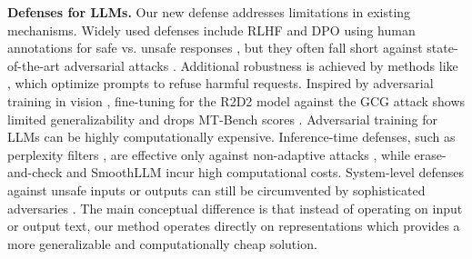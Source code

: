 \textbf{Defenses for LLMs.} \quad
Our new defense addresses limitations in existing mechanisms. Widely used defenses include RLHF \citep{christiano2017deep, ouyang2022training} and DPO \citep{rafailov2023direct} using human annotations for safe vs. unsafe responses \citep{touvron2023llama2}, but they often fall short against state-of-the-art adversarial attacks \citep{zou2023universal, andriushchenko2024jailbreaking}. Additional robustness is achieved by methods like \citet{zhou2024robust}, which optimize prompts to refuse harmful requests. Inspired by adversarial training in vision \citep{madry2017towards}, fine-tuning for the R2D2 model against the GCG attack \citep{mazeika2024harmbench} shows limited generalizability and drops MT-Bench scores \citep{zheng2023mtbench}. Adversarial training for LLMs can be highly computationally expensive. Inference-time defenses, such as perplexity filters \citep{alon2023detecting, jain2023baseline}, are effective only against non-adaptive attacks \citep{liu2023autodan}, while erase-and-check and SmoothLLM \citep{robey2023smoothllm} incur high computational costs. System-level defenses against unsafe inputs or outputs \citep{helbling2023llm, inan2023llama, kim2024jailbreaking} can still be circumvented by sophisticated adversaries \citep{mangaokar2024prp}. The main conceptual difference is that instead of operating on input or output text, our method operates directly on representations which provides a more generalizable and computationally cheap solution.









